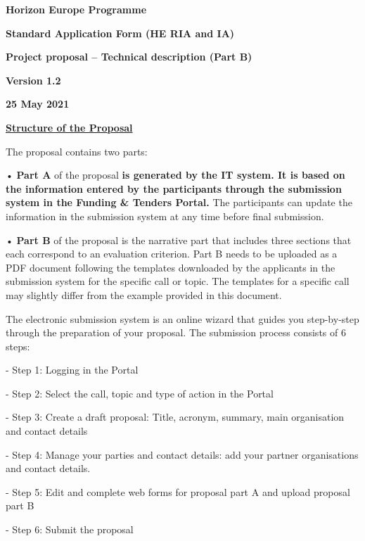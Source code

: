 \textbf{Horizon Europe Programme}

\textbf{Standard Application Form (HE RIA and IA)}

\textbf{Project proposal -- Technical description (Part B) }

\textbf{Version 1.2}

\textbf{25 May 2021}

\textbf{\uline{Structure of the Proposal }}

The proposal contains two parts:

• \textbf{Part A} of the proposal \textbf{is generated by the IT system.
It is based on the information entered by the participants through the
submission system in the Funding \& Tenders Portal.} The participants
can update the information in the submission system at any time before
final submission.

• \textbf{Part B} of the proposal is the narrative part that includes
three sections that each correspond to an evaluation criterion. Part B
needs to be uploaded as a PDF document following the templates
downloaded by the applicants in the submission system for the specific
call or topic. The templates for a specific call may slightly differ
from the example provided in this document.

The electronic submission system is an online wizard that guides you
step-by-step through the preparation of your proposal. The submission
process consists of 6 steps:

- Step 1: Logging in the Portal

- Step 2: Select the call, topic and type of action in the Portal

- Step 3: Create a draft proposal: Title, acronym, summary, main
organisation and contact details

- Step 4: Manage your parties and contact details: add your partner
organisations and contact details.

- Step 5: Edit and complete web forms for proposal part A and upload
proposal part B

- Step 6: Submit the proposal

